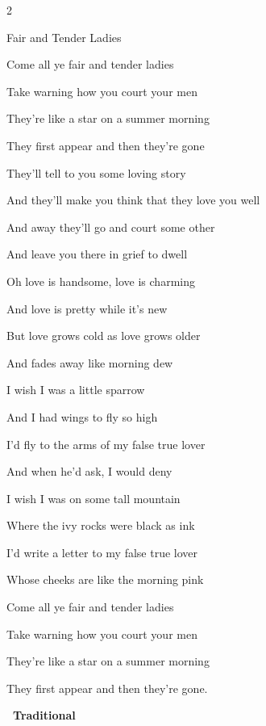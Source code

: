 \documentclass[10pt,twoside]{article}
\newcommand{\songtext}{\raggedright\fontsize{9bp}{9.15bp}\selectfont}
\newenvironment{songcolumns}
  {\begin{multicols*}{2}\songtext}
  {\end{multicols*}}
\newcommand{\songtitle}[1]{%
  \par\addvspace{9bp}%
  {\titleface\fontsize{14.5bp}{15bp}\selectfont #1\par}%
  \nobreak\vskip 2bp%
}
\newcommand{\lyric}[1]{%
  \hangindent=9bp\relax
  #1\par
}
\newenvironment{stanza}{\par\begingroup}{\par\endgroup\addvspace{4bp}}
\newcommand{\songcredit}[1]{%
  \par\nobreak\noindent\hspace*{9bp}%
  {\sffamily\bfseries\fontsize{7bp}{8bp}\selectfont\textemdash\ #1\par}%
}
\begin{document}
\begin{songcolumns}
\songtitle{Fair and Tender Ladies}
\begin{stanza}
  \lyric{Come all ye fair and tender ladies}
  \lyric{Take warning how you court your men}
  \lyric{They're like a star on a summer morning}
  \lyric{They first appear and then they're gone}
\end{stanza}
\begin{stanza}
  \lyric{They'll tell to you some loving story}
  \lyric{And they'll make you think that they love you well}
  \lyric{And away they'll go and court some other}
  \lyric{And leave you there in grief to dwell}
\end{stanza}
\begin{stanza}
  \lyric{Oh love is handsome, love is charming}
  \lyric{And love is pretty while it's new}
  \lyric{But love grows cold as love grows older}
  \lyric{And fades away like morning dew}
\end{stanza}
\begin{stanza}
  \lyric{I wish I was a little sparrow}
  \lyric{And I had wings to fly so high}
  \lyric{I'd fly to the arms of my false true lover}
  \lyric{And when he'd ask, I would deny}
\end{stanza}
\begin{stanza}
  \lyric{I wish I was on some tall mountain}
  \lyric{Where the ivy rocks were black as ink}
  \lyric{I'd write a letter to my false true lover}
  \lyric{Whose cheeks are like the morning pink}
\end{stanza}
\begin{stanza}
  \lyric{Come all ye fair and tender ladies}
  \lyric{Take warning how you court your men}
  \lyric{They're like a star on a summer morning}
  \lyric{They first appear and then they're gone.}
\end{stanza}
\songcredit{Traditional}

\columnbreak


\end{songcolumns}
\end{document}
